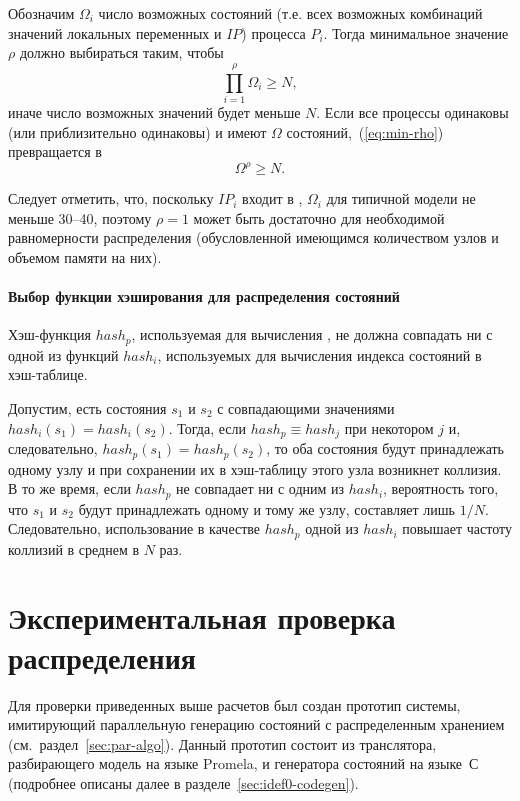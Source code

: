 Обозначим $\Omega_i$ число возможных состояний (т.е. всех возможных комбинаций значений
локальных переменных и $IP$) процесса $P_i$. Тогда минимальное значение $\rho$ должно
выбираться таким, чтобы
\begin{equation}
  \label{eq:min-rho}
  \prod_{i = 1}^\rho{\Omega_i} \geq N,
\end{equation}
иначе число возможных значений  будет меньше $N$. Если все процессы
одинаковы (или приблизительно одинаковы) и имеют $\Omega$ состояний,~(\ref{eq:min-rho})
превращается в 
\begin{equation}
  \label{eq:min-rho-homo}
  \Omega^\rho \geq N.
\end{equation}

Следует отметить, что, поскольку $IP_i$ входит в , $\Omega_i$ для типичной
модели не меньше 30--40, поэтому $\rho = 1$ может быть достаточно для необходимой
равномерности распределения (обусловленной имеющимся количеством узлов и объемом памяти на
них).

\paragraph{Выбор функции хэширования для распределения состояний}
\label{sec:partition-hash-function}

Хэш-функция $hash_p$, используемая для вычисления , не должна совпадать ни
с одной из функций $hash_i$, используемых для вычисления индекса состояний в
хэш-таблице. 

Допустим, есть состояния $s_1$ и $s_2$ с совпадающими значениями $hash_i(s_1) =
hash_i(s_2)$. Тогда, если $hash_p \equiv hash_j$ при некотором $j$ и, следовательно,
$hash_p(s_1) = hash_p(s_2)$, то оба состояния будут принадлежать одному узлу и при
сохранении их в хэш-таблицу этого узла возникнет коллизия. В то же время, если $hash_p$ не
совпадает ни с одним из $hash_i$, вероятность того, что $s_1$ и $s_2$ будут принадлежать
одному и тому же узлу, составляет лишь $1/N$. Следовательно, использование в качестве
$hash_p$ одной из $hash_i$ повышает частоту коллизий в среднем в $N$ раз.

\section{Экспериментальная проверка распределения}
\label{sec:paremu-test}

Для проверки приведенных выше расчетов был создан прототип системы, имитирующий
параллельную генерацию состояний с распределенным хранением
(см.~раздел~\ref{sec:par-algo}). Данный прототип состоит из транслятора, разбирающего
модель на языке Promela, и генератора состояний на языке~С (подробнее описаны далее в
разделе~\ref{sec:idef0-codegen}).

